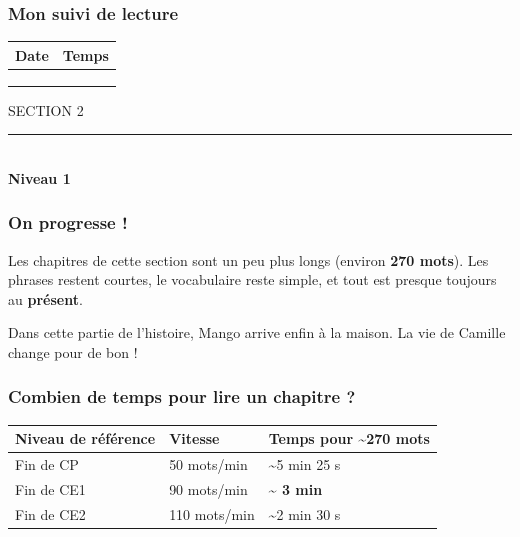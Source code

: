 \documentclass[
  french,
  french,
  14pt,
  a4paper]{extarticle}
\newcounter{none} %
\newcommand{\sectiondivider}[2]{%
  \vspace*{2cm}%
  \begin{center}
    {\fontsize{18pt}{22pt}\selectfont\textcolor{accentcolor}{\MakeUppercase{Section #1}}}\\[0.6em]
    \textcolor{accentcolor}{\rule{0.35\textwidth}{1.5pt}}\\[1em]
    {\fontsize{38pt}{44pt}\selectfont\bfseries #2}
  \end{center}
  \vspace{1.5cm}
}
\begin{document}
{\subsubsection{Mon suivi de lecture}\label{mon-suivi-de-lecture-3}

\begin{center}
\begin{tabularx}{\textwidth}{|X|X|}
\hline
\textbf{Date} & \textbf{Temps} \\
\hline
& \\
\hline
& \\
\hline
& \\
\hline
\end{tabularx}
\end{center}

}%
\newpage

\sectiondivider{2}{Niveau 1}

\subsubsection{On progresse !}\label{on-progresse}

Les chapitres de cette section sont un peu plus longs (environ
\textbf{270 mots}). Les phrases restent courtes, le vocabulaire reste
simple, et tout est presque toujours au \textbf{présent}.

Dans cette partie de l'histoire, Mango arrive enfin à la maison. La vie
de Camille change pour de bon !

\subsubsection{Combien de temps pour lire un chapitre
?}\label{combien-de-temps-pour-lire-un-chapitre-1}

{\def\LTcaptype{none} %
\begin{longtable}[]{@{}lll@{}}
\toprule\noalign{}
Niveau de référence & Vitesse & Temps pour \textasciitilde270 mots \\
\midrule\noalign{}
\endhead
\bottomrule\noalign{}
\endlastfoot
Fin de CP & 50 mots/min & \textasciitilde5 min 25 s \\
Fin de CE1 & 90 mots/min & \textbf{\textasciitilde{} 3 min} \\
Fin de CE2 & 110 mots/min & \textasciitilde2 min 30 s \\
\end{longtable}
}
\end{document}
